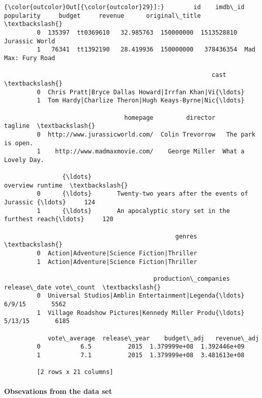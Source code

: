 \documentclass[11pt]{article}
\begin{document}
\begin{Verbatim}[commandchars=\\\{\}]
{\color{outcolor}Out[{\color{outcolor}29}]:}        id    imdb\_id  popularity     budget     revenue      original\_title  \textbackslash{}
         0  135397  tt0369610   32.985763  150000000  1513528810      Jurassic World   
         1   76341  tt1392190   28.419936  150000000   378436354  Mad Max: Fury Road   
         
                                                         cast  \textbackslash{}
         0  Chris Pratt|Bryce Dallas Howard|Irrfan Khan|Vi{\ldots}   
         1  Tom Hardy|Charlize Theron|Hugh Keays-Byrne|Nic{\ldots}   
         
                                 homepage         director             tagline  \textbackslash{}
         0  http://www.jurassicworld.com/  Colin Trevorrow   The park is open.   
         1    http://www.madmaxmovie.com/    George Miller  What a Lovely Day.   
         
                {\ldots}                                                overview runtime  \textbackslash{}
         0      {\ldots}       Twenty-two years after the events of Jurassic {\ldots}     124   
         1      {\ldots}       An apocalyptic story set in the furthest reach{\ldots}     120   
         
                                               genres  \textbackslash{}
         0  Action|Adventure|Science Fiction|Thriller   
         1  Action|Adventure|Science Fiction|Thriller   
         
                                         production\_companies release\_date vote\_count  \textbackslash{}
         0  Universal Studios|Amblin Entertainment|Legenda{\ldots}       6/9/15       5562   
         1  Village Roadshow Pictures|Kennedy Miller Produ{\ldots}      5/13/15       6185   
         
            vote\_average  release\_year    budget\_adj   revenue\_adj  
         0           6.5          2015  1.379999e+08  1.392446e+09  
         1           7.1          2015  1.379999e+08  3.481613e+08  
         
         [2 rows x 21 columns]
\end{Verbatim}
            
    \paragraph{Obsevations from the data
set}\label{obsevations-from-the-data-set}
\end{document}
